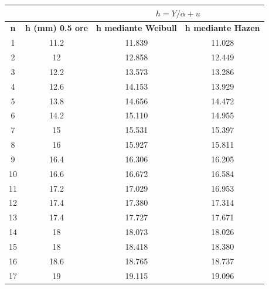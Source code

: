 \begin{table}[H] \centering
    \begin{tabular}{cccc}
 & & \multicolumn{2}{c}{$h = Y/\alpha + u$}       \\
 \toprule
    \textbf{n} & \textbf{h (mm)     0.5 ore} & \textbf{h mediante Weibull} & \textbf{h mediante Hazen} \\
\midrule
    1          & 11.2                        & 11.839                & 11.028                 \\
    2          & 12                          & 12.858                & 12.449                 \\
    3          & 12.2                        & 13.573                & 13.286                 \\
    4          & 12.6                        & 14.153                & 13.929                 \\
    5          & 13.8                        & 14.656                & 14.472                 \\
    6          & 14.2                        & 15.110                & 14.955                 \\
    7          & 15                          & 15.531                & 15.397                 \\
    8          & 16                          & 15.927                & 15.811                 \\
    9          & 16.4                        & 16.306                & 16.205                 \\
    10         & 16.6                        & 16.672                & 16.584                 \\
    11         & 17.2                        & 17.029                & 16.953                 \\
    12         & 17.4                        & 17.380                & 17.314                 \\
    13         & 17.4                        & 17.727                & 17.671                 \\
    14         & 18                          & 18.073                & 18.026                 \\
    15         & 18                          & 18.418                & 18.380                 \\
    16         & 18.6                        & 18.765                & 18.737                 \\
    17         & 19                          & 19.115                & 19.096                 \\

\end{tabular}
\end{table}

